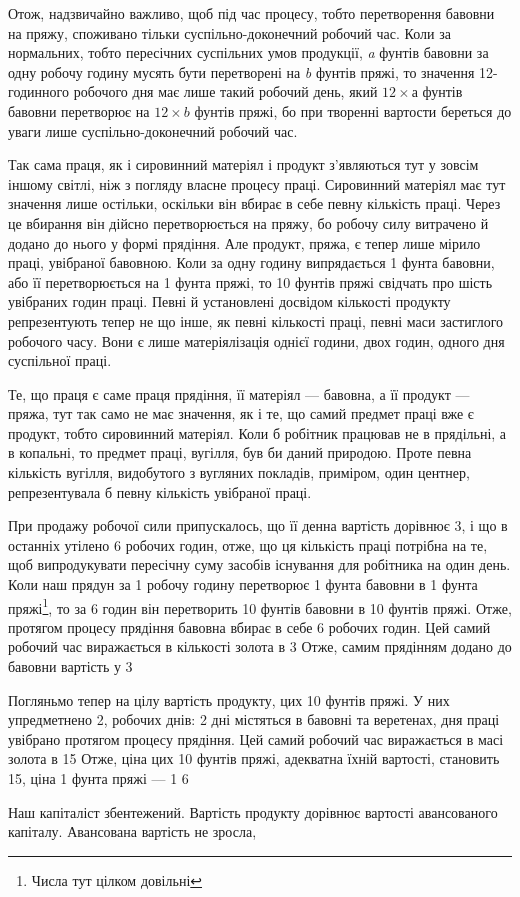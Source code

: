 Отож, надзвичайно важливо, щоб під час процесу, тобто перетворення
бавовни на пряжу, споживано тільки суспільно-доконечний
робочий час. Коли за нормальних, тобто пересічних
суспільних умов продукції, \emph{a} фунтів бавовни за одну робочу
годину мусять бути перетворені на \emph{b} фунтів пряжі, то значення
12-годинного робочого дня має лише такий робочий день, який
$12 × а$ фунтів бавовни перетворює на $12 × b$ фунтів пряжі, бо
при творенні вартости береться до уваги лише суспільно-доконечний
робочий час.

Так сама праця, як і сировинний матеріял і продукт з’являються
тут у зовсім іншому світлі, ніж з погляду власне процесу
праці. Сировинний матеріял має тут значення лише остільки,
оскільки він вбирає в себе певну кількість праці. Через це вбирання
він дійсно перетворюється на пряжу, бо робочу силу витрачено
й додано до нього у формі прядіння. Але продукт, пряжа,
є тепер лише мірило праці, увібраної бавовною. Коли за одну
годину випрядається 1 фунта бавовни, або її перетворюється на
1 фунта пряжі, то 10 фунтів пряжі свідчать про шість увібраних
годин праці. Певні й установлені досвідом кількості продукту
репрезентують тепер не що інше, як певні кількості праці, певні
маси застиглого робочого часу. Вони є лише матеріялізація однієї
години, двох годин, одного дня суспільної праці.

Те, що праця є саме праця прядіння, її матеріял — бавовна,
а її продукт — пряжа, тут так само не має значення, як і те, що
самий предмет праці вже є продукт, тобто сировинний матеріял.
Коли б робітник працював не в прядільні, а в копальні, то предмет
праці, вугілля, був би даний природою. Проте певна кількість
вугілля, видобутого з вугляних покладів, приміром, один
центнер, репрезентувала б певну кількість увібраної праці.

При продажу робочої сили припускалось, що її денна вартість
дорівнює 3, і що в останніх утілено 6 робочих годин,
отже, що ця кількість праці потрібна на те, щоб випродукувати
пересічну суму засобів існування для робітника на один день.
Коли наш прядун за 1 робочу годину перетворює 1 фунта
бавовни в 1 фунта пряжі\footnote{Числа тут цілком довільні}, то за 6 годин він перетворить
10 фунтів бавовни в 10 фунтів пряжі. Отже, протягом процесу
прядіння бавовна вбирає в себе 6 робочих годин. Цей самий робочий
час виражається в кількості золота в 3 Отже, самим
прядінням додано до бавовни вартість у 3

Погляньмо тепер на цілу вартість продукту, цих 10 фунтів
пряжі. У них упредметнено 2, робочих днів: 2 дні містяться в
бавовні та веретенах,  дня праці увібрано протягом процесу прядіння.
Цей самий робочий час виражається в масі золота в 15
Отже, ціна цих 10 фунтів пряжі, адекватна їхній вартості,
становить 15, ціна 1 фунта пряжі — 1 6

Наш капіталіст збентежений. Вартість продукту дорівнює
вартості авансованого капіталу. Авансована вартість не зросла,
\parbreak{}  %
